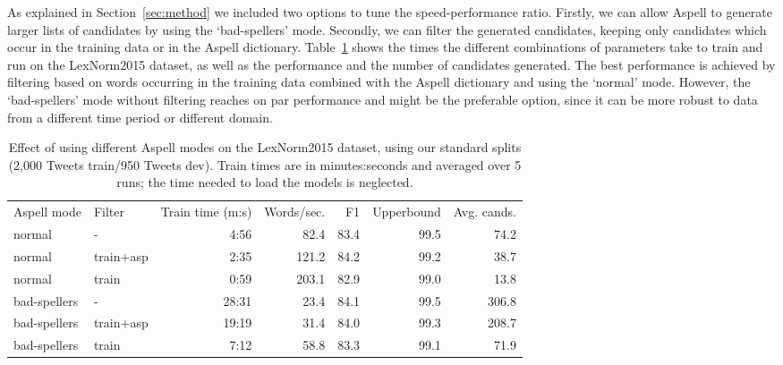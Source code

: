 \documentclass[a4paper,10pt,twoside]{article}
\begin{document}
\label{sec:aspell}
As explained in Section~\ref{sec:method} we included two options to tune the 
speed-performance ratio. Firstly, we can allow Aspell to generate larger lists 
of candidates by using the `bad-spellers' mode. Secondly, we can filter the generated
candidates, keeping only candidates which occur in the training data or in the 
Aspell dictionary. Table~\ref{tab:aspTime} shows the times the different
combinations of parameters take to train and run on the LexNorm2015 dataset, as
well as the performance and the number of candidates generated. The best
performance is achieved by filtering based on words occurring in the training
data combined with the Aspell dictionary and using the `normal' mode. However,
the `bad-spellers' mode without filtering reaches on par performance and might
be the preferable option, since it can be more robust to data from a different
time period or different domain.

\begin{table}[h]
    \centering
    \begin{tabular}{l l r r r r r}
        Aspell mode  & Filter   & Train time (m:s) & Words/sec. & F1 & Upperbound & Avg. cands. \\
        normal       & -        & 4:56  & 82.4   & 83.4 & 99.5 & 74.2 \\
        normal       & train+asp& 2:35  & 121.2  & 84.2 & 99.2 & 38.7 \\
        normal       & train    & 0:59  & 203.1  & 82.9 & 99.0 & 13.8 \\
        bad-spellers & -        & 28:31 & 23.4   & 84.1 & 99.5 & 306.8 \\
        bad-spellers & train+asp& 19:19 & 31.4   & 84.0 & 99.3 & 208.7 \\
        bad-spellers & train    & 7:12  & 58.8   & 83.3 & 99.1 & 71.9 \\
    \end{tabular}
    \caption{Effect of using different Aspell modes on the LexNorm2015 dataset, using our standard splits (2,000 Tweets train/950 Tweets dev). Train times are in minutes:seconds and averaged over 5 runs; the time needed to load the models is neglected.}
    \label{tab:aspTime}
\end{table}
\end{document}

